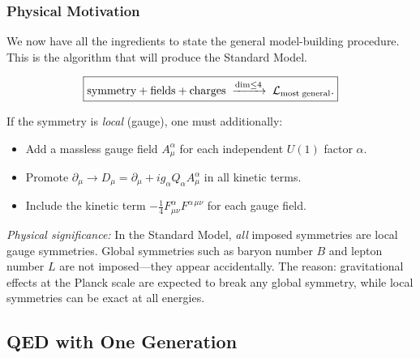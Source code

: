 \documentclass[../main.tex]{subfiles}
\begin{document}
\subsubsection*{Physical Motivation}

We now have all the ingredients to state the general model-building procedure.  This is the algorithm that will produce the Standard Model.


\begin{equation}
  \boxed{
  \text{symmetry} + \text{fields} + \text{charges}
  \;\xrightarrow{\dim\leq 4}\;
  \mathcal{L}_{\rm most\;general}.}
  \label{eq:lec11:model-building}
\end{equation}

If the symmetry is \emph{local} (gauge), one must additionally:
\begin{itemize}
  \item Add a massless gauge field $A_\mu^\alpha$ for each independent $U(1)$ factor $\alpha$.
  \item Promote $\partial_\mu \to D_\mu = \partial_\mu + ig_\alpha Q_\alpha A_\mu^\alpha$ in all kinetic terms.
  \item Include the kinetic term $-\frac{1}{4}F_{\mu\nu}^\alpha F^{\alpha\,\mu\nu}$ for each gauge field.
\end{itemize}

\textit{Physical significance:} In the Standard Model, \emph{all} imposed symmetries are local gauge symmetries.  Global symmetries such as baryon number $B$ and lepton number $L$ are not imposed—they appear accidentally.  The reason: gravitational effects at the Planck scale are expected to break any global symmetry, while local symmetries can be exact at all energies.

\subsection*{QED with One Generation}\label{sec:lec11:qed-one-gen}
\end{document}
